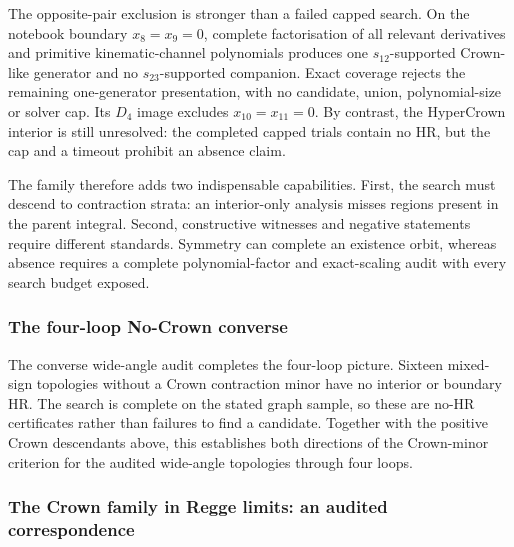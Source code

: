 \documentclass[a4paper,11pt]{article}
\begin{document}
The opposite-pair exclusion is stronger than a failed capped search.  On
the notebook boundary \(x_8=x_9=0\), complete factorisation of all relevant
derivatives and primitive kinematic-channel polynomials produces one
\(s_{12}\)-supported Crown-like generator and no \(s_{23}\)-supported
companion.  Exact coverage rejects the remaining one-generator presentation,
with no candidate, union, polynomial-size or solver cap.  Its \(D_4\) image
excludes \(x_{10}=x_{11}=0\).  By contrast, the HyperCrown interior is still
unresolved: the completed capped trials contain no HR, but the cap and a
timeout prohibit an absence claim.

The family therefore adds two indispensable capabilities.  First, the
search must descend to contraction strata: an interior-only analysis misses
regions present in the parent integral.  Second, constructive witnesses and
negative statements require different standards.  Symmetry can complete an
existence orbit, whereas absence requires a complete polynomial-factor and
exact-scaling audit with every search budget exposed.

\subsubsection{The four-loop No-Crown converse}

The converse wide-angle audit completes the four-loop picture.  Sixteen
mixed-sign topologies without a Crown contraction minor have no interior or
boundary HR.  The search is complete on the stated graph sample, so these are
no-HR certificates rather than failures to find a candidate.  Together with
the positive Crown descendants above, this establishes both directions of
the Crown-minor criterion for the audited wide-angle topologies through four
loops.

\subsubsection{The Crown family in Regge limits: an audited correspondence}
\label{sec:crown-wide-angle-regge}
\end{document}
